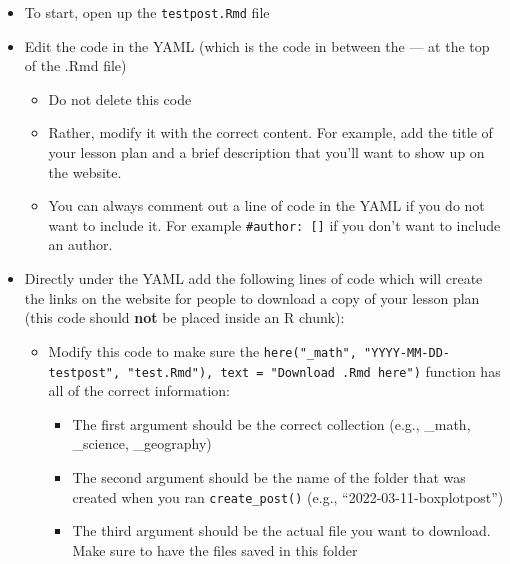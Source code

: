 \documentclass[
]{article}
\providecommand{\tightlist}{%
  \setlength{\itemsep}{0pt}\setlength{\parskip}{0pt}}
\begin{document}
\begin{itemize}
\item
  To start, open up the \texttt{testpost.Rmd} file
\item
  Edit the code in the YAML (which is the code in between the --- at the
  top of the .Rmd file)

  \begin{itemize}
  \tightlist
  \item
    Do not delete this code
  \item
    Rather, modify it with the correct content. For example, add the
    title of your lesson plan and a brief description that you'll want
    to show up on the website.
  \item
    You can always comment out a line of code in the YAML if you do not
    want to include it. For example \texttt{\#author:\ {[}{]}} if you
    don't want to include an author.
  \end{itemize}
\item
  Directly under the YAML add the following lines of code which will
  create the links on the website for people to download a copy of your
  lesson plan (this code should \textbf{not} be placed inside an R
  chunk):

  \begin{itemize}
  \item
    Modify this code to make sure the
    \texttt{here("\_math",\ "YYYY-MM-DD-testpost",\ "test.Rmd"),\ text\ =\ "Download\ .Rmd\ here")}
    function has all of the correct information:

    \begin{itemize}
    \tightlist
    \item
      The first argument should be the correct collection (e.g., \_math,
      \_science, \_geography)
    \item
      The second argument should be the name of the folder that was
      created when you ran \texttt{create\_post()} (e.g.,
      ``2022-03-11-boxplotpost'')
    \item
      The third argument should be the actual file you want to download.
      Make sure to have the files saved in this folder
    \end{itemize}
  \end{itemize}
\end{itemize}
\end{document}
